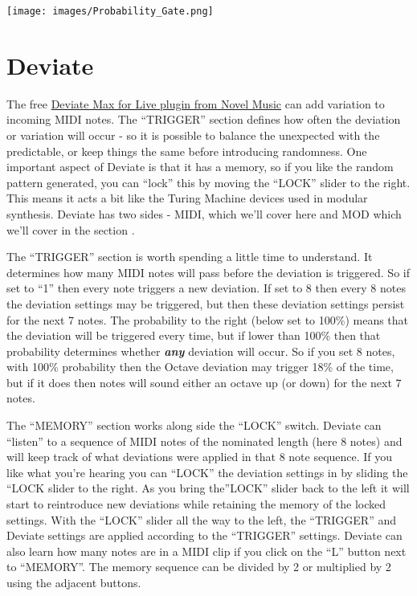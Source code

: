 \documentclass[
  12pt,
  letterpaper,
  oneside,
  open=any]{scrbook}
\begin{document}
\texttt{[image: images/Probability\_Gate.png]}

\section{Deviate}\label{deviate}

The free \href{https://www.novelmusic.org/m4l/deviate}{Deviate Max for
Live plugin from Novel Music} can add variation to incoming MIDI notes.
The ``TRIGGER'' section defines how often the deviation or variation
will occur - so it is possible to balance the unexpected with the
predictable, or keep things the same before introducing randomness. One
important aspect of Deviate is that it has a memory, so if you like the
random pattern generated, you can ``lock'' this by moving the ``LOCK''
slider to the right. This means it acts a bit like the Turing Machine
devices used in modular synthesis. Deviate has two sides - MIDI, which
we'll cover here and MOD which we'll cover in the section .

The ``TRIGGER'' section is worth spending a little time to understand.
It determines how many MIDI notes will pass before the deviation is
triggered. So if set to ``1'' then every note triggers a new deviation.
If set to 8 then every 8 notes the deviation settings may be triggered,
but then these deviation settings persist for the next 7 notes. The
probability to the right (below set to 100\%) means that the deviation
will be triggered every time, but if lower than 100\% then that
probability determines whether \textbf{\emph{any}} deviation will occur.
So if you set 8 notes, with 100\% probability then the Octave deviation
may trigger 18\% of the time, but if it does then notes will sound
either an octave up (or down) for the next 7 notes.

The ``MEMORY'' section works along side the ``LOCK'' switch. Deviate can
``listen'' to a sequence of MIDI notes of the nominated length (here 8
notes) and will keep track of what deviations were applied in that 8
note sequence. If you like what you're hearing you can ``LOCK'' the
deviation settings in by sliding the ``LOCK slider to the right. As you
bring the''LOCK'' slider back to the left it will start to reintroduce
new deviations while retaining the memory of the locked settings. With
the ``LOCK'' slider all the way to the left, the ``TRIGGER'' and Deviate
settings are applied according to the ``TRIGGER'' settings. Deviate can
also learn how many notes are in a MIDI clip if you click on the ``L''
button next to ``MEMORY''. The memory sequence can be divided by 2 or
multiplied by 2 using the adjacent buttons.
\end{document}
